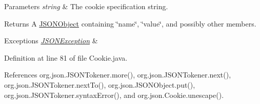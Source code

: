 \begin{DoxyParams}{Parameters}
{\em string} & The cookie specification string. \\
\hline
\end{DoxyParams}
\begin{DoxyReturn}{Returns}
A \hyperlink{classorg_1_1json_1_1_j_s_o_n_object}{J\-S\-O\-N\-Object} containing \char`\"{}name\char`\"{}, \char`\"{}value\char`\"{}, and possibly other members. 
\end{DoxyReturn}

\begin{DoxyExceptions}{Exceptions}
{\em \hyperlink{classorg_1_1json_1_1_j_s_o_n_exception}{J\-S\-O\-N\-Exception}} & \\
\hline
\end{DoxyExceptions}


Definition at line 81 of file Cookie.\-java.



References org.\-json.\-J\-S\-O\-N\-Tokener.\-more(), org.\-json.\-J\-S\-O\-N\-Tokener.\-next(), org.\-json.\-J\-S\-O\-N\-Tokener.\-next\-To(), org.\-json.\-J\-S\-O\-N\-Object.\-put(), org.\-json.\-J\-S\-O\-N\-Tokener.\-syntax\-Error(), and org.\-json.\-Cookie.\-unescape().


